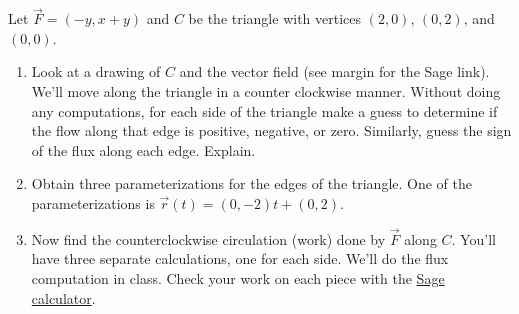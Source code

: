 \begin{problem}
%
%
Let $\vec F=(-y,x+y)$ and $C$ be the triangle with vertices $(2,0)$, $(0,2)$, and $(0,0)$.
\begin{enumerate}
\item Look at a drawing of $C$ and the vector field (see margin for the Sage link).  We'll move along the triangle in a counter clockwise manner. Without doing any computations, for each side of the triangle make a guess to determine if the flow along that edge is positive, negative, or zero. Similarly, guess the sign of the flux along each edge.  Explain. 
\item Obtain three parameterizations for the edges of the triangle.  One of the parameterizations is $\vec r(t) = (0,-2)t+(0,2)$. 
\item Now find the counterclockwise circulation (work) done by $\vec F$ along $C$.  You'll have three separate calculations, one for each side. We'll do the flux computation in class. Check your work on each piece with the \href{\sageworkfluxurl}{Sage calculator}. 
\end{enumerate}
\end{problem}

